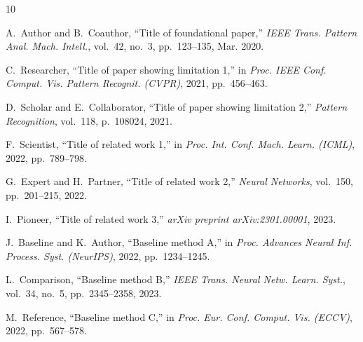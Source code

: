 \documentclass[conference,10pt]{IEEEtran}
\begin{document}
\balance

% 
% 

\begin{thebibliography}{10}

    A.~Author and B.~Coauthor,
    ``Title of foundational paper,''
    \textit{IEEE Trans. Pattern Anal. Mach. Intell.},
    vol.~42, no.~3, pp.~123--135, Mar. 2020.

    C.~Researcher,
    ``Title of paper showing limitation 1,''
    in \textit{Proc. IEEE Conf. Comput. Vis. Pattern Recognit. (CVPR)},
    2021, pp.~456--463.

    D.~Scholar and E.~Collaborator,
    ``Title of paper showing limitation 2,''
    \textit{Pattern Recognition}, vol.~118, p.~108024, 2021.

    F.~Scientist,
    ``Title of related work 1,''
    in \textit{Proc. Int. Conf. Mach. Learn. (ICML)}, 2022, pp.~789--798.

    G.~Expert and H.~Partner,
    ``Title of related work 2,''
    \textit{Neural Networks}, vol.~150, pp.~201--215, 2022.

    I.~Pioneer,
    ``Title of related work 3,''
    \textit{arXiv preprint arXiv:2301.00001}, 2023.

    J.~Baseline and K.~Author,
    ``Baseline method A,''
    in \textit{Proc. Advances Neural Inf. Process. Syst. (NeurIPS)},
    2022, pp.~1234--1245.

    L.~Comparison,
    ``Baseline method B,''
    \textit{IEEE Trans. Neural Netw. Learn. Syst.},
    vol.~34, no.~5, pp.~2345--2358, 2023.

    M.~Reference,
    ``Baseline method C,''
    in \textit{Proc. Eur. Conf. Comput. Vis. (ECCV)}, 2022, pp.~567--578.

\end{thebibliography}
\end{document}

